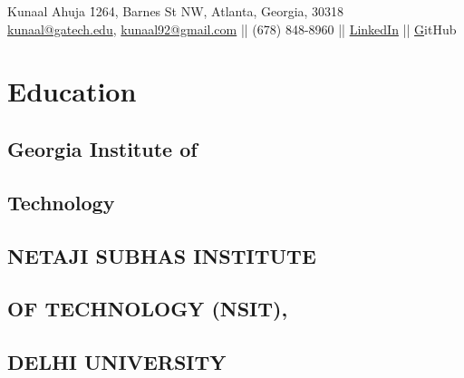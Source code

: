 \documentclass[]{resume-openfont}
\begin{document}
%
%
\namesection{}
{Kunaal Ahuja}{
\h{1264, Barnes St NW, Atlanta, Georgia, 30318} \\
\href{mailto:kunaal@gatech.edu}{kunaal@gatech.edu}, \href{mailto:kunaal92@gmail.com}{kunaal92@gmail.com} || 
(678) 848-8960 ||
\href{https://www.linkedin.com/in/kunaal-ahuja/}{LinkedIn} ||  
\href{https://github.com/kunaalahuja/}GitHub \\
}
%
%

\begin{minipage}[t]{0.33\textwidth} 


\section{Education} 

\subsection{Georgia Institute of} 
\subsection{Technology}
\sectionsep

\subsection{NETAJI SUBHAS INSTITUTE} 
\subsection{OF TECHNOLOGY (NSIT),}
\subsection{DELHI UNIVERSITY}
\sectionsep



\end{minipage}
\end{document}
